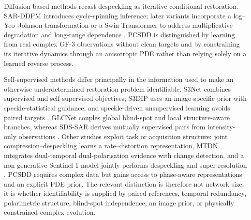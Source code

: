 \documentclass[11pt]{article}
\begin{document}
Diffusion-based methods recast despeckling as iterative conditional restoration. SAR-DDPM introduces cycle-spinning inference; later variants incorporate a log--Yeo--Johnson transformation or a Swin Transformer to address multiplicative degradation and long-range dependence \cite{Perera2023SARDDPM,Ma2024ConditionalDiffusion,Pan2024SwinDiffusion}. PCSDD is distinguished by learning from real complex GF-3 observations without clean targets and by constraining its iterative dynamics through an anisotropic PDE rather than relying solely on a learned reverse process.

Self-supervised methods differ principally in the information used to make an otherwise underdetermined restoration problem identifiable. S3Net combines supervised and self-supervised objectives; S3DIP uses an image-specific prior with speckle-statistical guidance; and speckle-driven unsupervised learning avoids paired targets \cite{Liu2024S3Net,Albisani2025S3DIP,Bo2025SpeckleDriven}. GLCNet couples global blind-spot and local structure-aware branches, whereas SDS-SAR derives mutually supervised pairs from intensity-only observations \cite{Yang2026GLCNet,Chen2026SDSSAR}. Other studies exploit task or acquisition structure: joint compression--despeckling learns a rate--distortion representation, MTDN integrates dual-temporal dual-polarisation evidence with change detection, and a non-generative Sentinel-1 model jointly performs despeckling and super-resolution \cite{Amao2025Joint,Li2025MTDN,Amieva2026Joint}. PCSDD requires complex data but gains access to phase-aware representations and an explicit PDE prior. The relevant distinction is therefore not network size; it is whether identifiability is supplied by paired references, temporal redundancy, polarimetric structure, blind-spot independence, an image prior, or physically constrained complex evolution.
\end{document}
